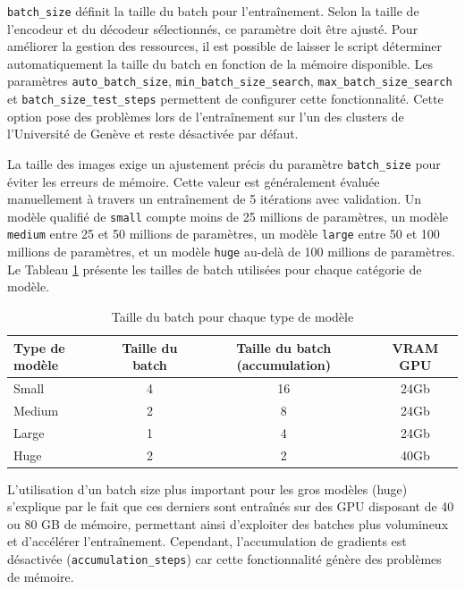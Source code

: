 \texttt{batch\_size} définit la taille du batch pour l'entraînement. Selon la taille de l'encodeur et du décodeur sélectionnés, ce paramètre doit être ajusté. Pour améliorer la gestion des ressources, il est possible de laisser le script déterminer automatiquement la taille du batch en fonction de la mémoire disponible. Les paramètres \texttt{auto\_batch\_size}, \texttt{min\_batch\_size\_search}, \texttt{max\_batch\_size\_search} et \texttt{batch\_size\_test\_steps} permettent de configurer cette fonctionnalité. Cette option pose des problèmes lors de l'entraînement sur l'un des clusters de l'Université de Genève et reste désactivée par défaut.

La taille des images exige un ajustement précis du paramètre \texttt{batch\_size} pour éviter les erreurs de mémoire. Cette valeur est généralement évaluée manuellement à travers un entraînement de 5 itérations avec validation. Un modèle qualifié de \texttt{small} compte moins de 25 millions de paramètres, un modèle \texttt{medium} entre 25 et 50 millions de paramètres, un modèle \texttt{large} entre 50 et 100 millions de paramètres, et un modèle \texttt{huge} au-delà de 100 millions de paramètres. Le Tableau \ref{tab:ch36_batch_size} présente les tailles de batch utilisées pour chaque catégorie de modèle.

\begin{table}[H]
    \centering
    \begin{tabular}{@{}lccc@{}}
    \toprule
    \textbf{Type de modèle} & \textbf{Taille du batch} & \textbf{Taille du batch (accumulation)} & \textbf{VRAM GPU} \\
    \midrule
    Small & 4 & 16 & 24Gb \\
    Medium & 2 & 8 & 24Gb \\
    Large & 1 & 4 & 24Gb \\
    Huge & 2 & 2 & 40Gb \\
    \bottomrule
    \end{tabular}
    \caption{Taille du batch pour chaque type de modèle}
    \label{tab:ch36_batch_size}
\end{table}

L'utilisation d'un batch size plus important pour les gros modèles (huge) s'explique par le fait que ces derniers sont entraînés sur des GPU disposant de 40 ou 80 GB de mémoire, permettant ainsi d'exploiter des batches plus volumineux et d'accélérer l'entraînement. Cependant, l'accumulation de gradients est désactivée (\texttt{accumulation\_steps}) car cette fonctionnalité génère des problèmes de mémoire. 

